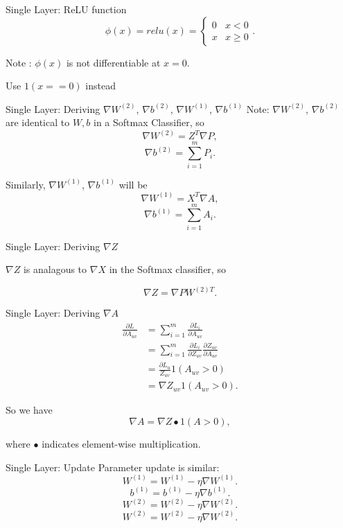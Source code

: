 \documentclass{beamer}
\begin{document}
  \begin{frame}{Single Layer: ReLU function}
    $$ \phi(x) = relu(x) =
      \begin{cases}
        0 & x < 0\\
        x & x \geq 0
      \end{cases}.$$

  Note : $\phi(x)$ is not differentiable at $x = 0$.

  Use $1(x == 0)$ instead
  \end{frame}

  \begin{frame}{Single Layer: Deriving $\nabla W^{(2)}$, $\nabla
  b^{(2)}$, $\nabla W^{(1)}$, $\nabla b^{(1)}$}
    Note: $\nabla W^{(2)}$, $\nabla b^{(2)}$ are identical to $W, b$ in a Softmax Classifier, so
    $$ \nabla W^{(2)} = Z^T \nabla P, $$
    $$ \nabla b^{(2)} = \sum_{i=1}^m P_i. $$

    Similarly, $\nabla W^{(1)}$, $\nabla b^{(1)}$ will be
    $$ \nabla W^{(1)} = X^T \nabla A, $$
    $$ \nabla b^{(1)} = \sum_{i=1}^m A_i.$$
  \end{frame}

  \begin{frame}{Single Layer: Deriving $\nabla Z$}
    
    $\nabla Z$ is analagous to $\nabla X$ in the Softmax classifier, so

    $$ \nabla Z = \nabla P W^{(2)T}. $$
      
  \end{frame}

  \begin{frame}{Single Layer: Deriving $\nabla A$}
    \begin{align*}
      \frac{\partial L}{\partial A_{uv}}
      &= \sum_{i=1}^m \frac{\partial L_i}{\partial A_{uv}}\\
      &= \sum_{i=1}^m \frac{\partial L_i}{\partial Z_{uv}} \frac{\partial
         Z_{uv}}{\partial A_{uv}}\\
      &= \frac{\partial L_u}{Z_{uv}} 1(A_{uv} > 0)\\
      &= \nabla Z_{uv} 1(A_{uv} > 0).
    \end{align*}

    So we have
    $$ \nabla A = \nabla Z \bullet 1(A > 0), $$

    where $\bullet$ indicates element-wise multiplication.
  \end{frame}

  \begin{frame}{Single Layer: Update}
    Parameter update is similar:
      $$ W^{(1)} = W^{(1)} - \eta \nabla W^{(1)}. $$
      $$ b^{(1)} = b^{(1)} - \eta \nabla b^{(1)}. $$
      $$ W^{(2)} = W^{(2)} - \eta \nabla W^{(2)}. $$
      $$ W^{(2)} = W^{(2)} - \eta \nabla W^{(2)}. $$
  \end{frame}
\end{document}
